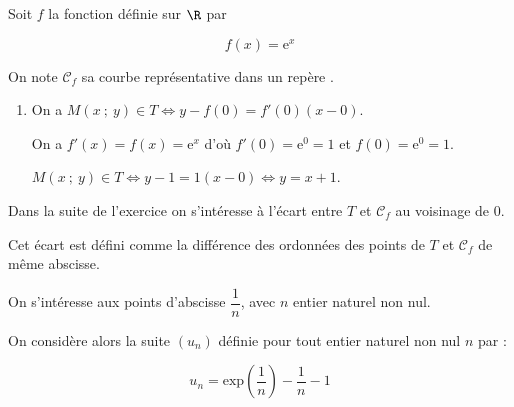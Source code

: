 \medskip

Soit $f$ la fonction définie sur $\R$ par

\[f(x) = \text{e}^x\]

On note $\mathcal{C}_f$ sa courbe représentative dans un repère \Oij.

\medskip

\begin{enumerate}
\item %
On a $M(x~;~y) \in T \iff y - f(0) = f'(0)(x - 0)$.

On a $f'(x) = f(x) = \text{e}^x$ d'où $f'(0) = \text{e}^0  = 1$ et $f(0) = \text{e}^0  = 1$.

$M(x~;~y) \in T \iff y - 1 = 1 (x - 0) \iff y = x + 1$.
\end{enumerate}

Dans la suite de l'exercice on s'intéresse à l'écart entre $T$ et $\mathcal{C}_f$ au voisinage de $0$. 

Cet écart est défini comme la différence des ordonnées des points de $T$ et $\mathcal{C}_f$ de même abscisse.

On s'intéresse aux points d'abscisse $\dfrac{1}{n}$, avec $n$ entier naturel non nul.

On considère alors la suite $\left(u_n\right)$ définie pour tout entier naturel non nul $n$ par : 

\[u_n = \text{exp} \left(\dfrac{1}{n}\right) - \dfrac{1}{n} - 1\]

